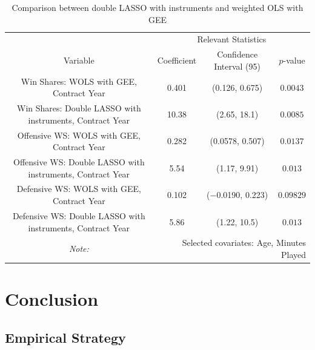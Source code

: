 \documentclass[12pt]{article}
\begin{document}
	\begin{landscape}
		\begin{table}[!htbp]
			\centering
			\caption{Comparison between double LASSO with instruments and weighted OLS with GEE}
			\label{lassoivvsgee} 
			\begin{tabular}{*4c}
				\toprule
				& \multicolumn{3}{c}{Relevant Statistics} \\
				\cmidrule(lr){2-4}
				Variable & Coefficient  & Confidence Interval (95) & $p$-value \\
				\midrule
				Win Shares: WOLS with GEE, Contract Year & 0.401       & (0.126, 0.675) & $0.0043$       \\
				Win Shares: Double LASSO with instruments, Contract Year & 10.38       & (2.65, 18.1) & $0.0085$       \\
				Offensive WS: WOLS with GEE, Contract Year & 0.282       & (0.0578, 0.507) & $0.0137$       \\
				Offensive WS: Double LASSO with instruments, Contract Year & 5.54       & (1.17, 9.91) & $0.013$       \\
				Defensive WS: WOLS with GEE, Contract Year & 0.102       & ($-$0.0190, 0.223) & $0.09829$       \\
				Defensive WS: Double LASSO with instruments, Contract Year & 5.86       & (1.22, 10.5) & $0.013$       \\
				\bottomrule
				\textit{Note:}  & \multicolumn{3}{r}{Selected covariates: Age, Minutes Played} \\
			\end{tabular}
		\end{table}
	\end{landscape}
	
	\pagebreak
	
	\section{Conclusion} \label{sec:conclusion}
	
	\subsection{Empirical Strategy}
	
\end{document}
